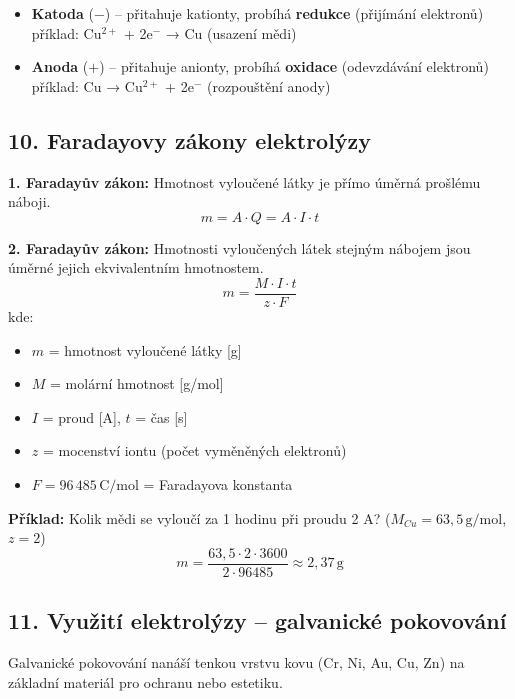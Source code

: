 \documentclass[a4paper,10pt]{article}
\begin{document}
\begin{vysvetlenibox}
\begin{itemize}
  \item \textbf{Katoda} ($-$) – přitahuje kationty, probíhá \textbf{redukce} (přijímání elektronů)\\
    příklad: Cu$^{2+}$ + 2e$^-$ → Cu (usazení mědi)
  \item \textbf{Anoda} ($+$) – přitahuje anionty, probíhá \textbf{oxidace} (odevzdávání elektronů)\\
    příklad: Cu → Cu$^{2+}$ + 2e$^-$ (rozpouštění anody)
\end{itemize}

\subsection*{10. Faradayovy zákony elektrolýzy}

\begin{vzorcebox}
\textbf{1. Faradayův zákon:} Hmotnost vyloučené látky je přímo úměrná prošlému náboji.
\[
m = A \cdot Q = A \cdot I \cdot t
\]

\textbf{2. Faradayův zákon:} Hmotnosti vyloučených látek stejným nábojem jsou úměrné jejich ekvivalentním hmotnostem.
\[
m = \frac{M \cdot I \cdot t}{z \cdot F}
\]
kde:
\begin{itemize}
  \item $m$ = hmotnost vyloučené látky [g]
  \item $M$ = molární hmotnost [g/mol]
  \item $I$ = proud [A], $t$ = čas [s]
  \item $z$ = mocenství iontu (počet vyměněných elektronů)
  \item $F = 96\,485\,\mathrm{C/mol}$ = Faradayova konstanta
\end{itemize}
\end{vzorcebox}

\textbf{Příklad:} Kolik mědi se vyloučí za 1 hodinu při proudu 2 A?
($M_{Cu} = 63{,}5\,\mathrm{g/mol}$, $z = 2$)
\[
m = \frac{63{,}5 \cdot 2 \cdot 3600}{2 \cdot 96485} \approx 2{,}37\,\mathrm{g}
\]

\subsection*{11. Využití elektrolýzy – galvanické pokovování}

Galvanické pokovování nanáší tenkou vrstvu kovu (Cr, Ni, Au, Cu, Zn) na základní materiál pro ochranu nebo estetiku.


\end{vysvetlenibox}
\end{document}
